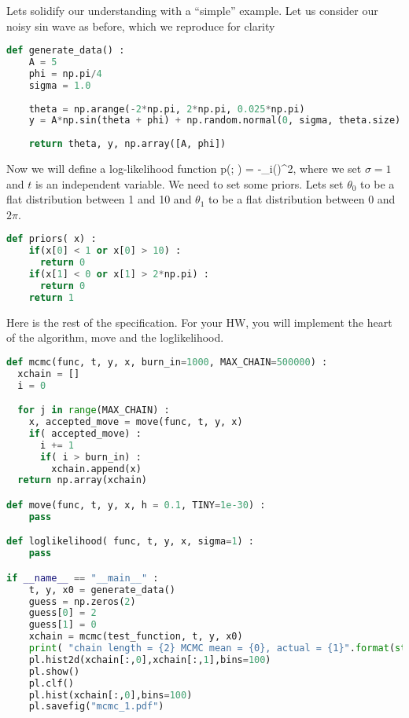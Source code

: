 Lets solidify our understanding with a ``simple'' example.  Let us consider our noisy sin wave as before, which we reproduce for clarity

\begin{lstlisting}[language=Python]
def generate_data() :
    A = 5
    phi = np.pi/4
    sigma = 1.0
  
    theta = np.arange(-2*np.pi, 2*np.pi, 0.025*np.pi)
    y = A*np.sin(theta + phi) + np.random.normal(0, sigma, theta.size)
  
    return theta, y, np.array([A, phi])
\end{lstlisting}  

Now we will define a log-likelihood function
\be
\log p(; \vec{\theta}) = -\sum_i\left(\right)^2,
\ee
where we set $\sigma = 1$ and $t$ is an independent variable.  We need to set some priors. Lets set $\theta_0$ to be a flat distribution between 1 and 10 and $\theta_1$ to be a flat distribution between 0 and $2\pi$.  

\begin{lstlisting}[language=Python]
def priors( x) : 
    if(x[0] < 1 or x[0] > 10) : 
      return 0
    if(x[1] < 0 or x[1] > 2*np.pi) : 
      return 0
    return 1  
\end{lstlisting}

Here is the rest of the specification.  For your HW, you will implement the heart of the algorithm, move and the loglikelihood.

\begin{lstlisting}[language=Python]
def mcmc(func, t, y, x, burn_in=1000, MAX_CHAIN=500000) :
  xchain = [] 
  i = 0

  for j in range(MAX_CHAIN) : 
    x, accepted_move = move(func, t, y, x)
    if( accepted_move) :
      i += 1 
      if( i > burn_in) : 
        xchain.append(x)
  return np.array(xchain)

def move(func, t, y, x, h = 0.1, TINY=1e-30) :
    pass

def loglikelihood( func, t, y, x, sigma=1) : 
    pass

if __name__ == "__main__" : 
    t, y, x0 = generate_data()
    guess = np.zeros(2)
    guess[0] = 2
    guess[1] = 0
    xchain = mcmc(test_function, t, y, x0)
    print( "chain length = {2} MCMC mean = {0}, actual = {1}".format(str(np.average(xchain, axis=0)), str(x0), xchain.shape[0]))
    pl.hist2d(xchain[:,0],xchain[:,1],bins=100)
    pl.show()
    pl.clf()
    pl.hist(xchain[:,0],bins=100)
    pl.savefig("mcmc_1.pdf")

\end{lstlisting}


